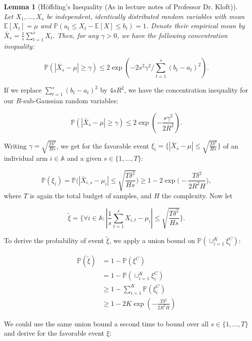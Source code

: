 \documentclass[11pt,]{article}
\newtheorem{lemma}{Lemma}
\begin{document}
\begin{lemma}[Höffding's Inequality (As in lecture notes of Professor Dr. Kloft)] \label{lemma:HoeffdingsInequality}
Let $X_1, ..., X_s$ be independent, identically distributed random variables with mean $\mathbb{E}[X_t] = \mu$ and $\mathbb{P}(a_t \leq X_t - \mathbb{E}[X] \leq b_t) = 1$. Denote their empirical mean by $\bar{X}_s=\frac{1}{s}\sum_{t=1}^{s}X_t$. Then, for any $\gamma > 0$, we have the following concentration inequality:

\begin{equation*}
\mathbb{P}(|\bar{X}_s - \mu| \geq \gamma) \leq 2\exp (-2s^2\gamma^2/\sum_{t=1}^s(b_t - a_t)^2).
\end{equation*}
\end{lemma}

If we replace \(\sum_{t=1}^s(b_t - a_t)^2\) by \(4sR^2\), we have the
concentration inequality for our \(R\)-sub-Gaussian random variables:

\[
\mathbb{P}(|\bar{X}_s - \mu| \geq \gamma) \leq 2\exp (-\frac{s\gamma^2}{2R^2}).
\]

Writing \(\gamma = \sqrt{\frac{T\delta^2}{Hs}}\), we get for the
favorable event
\(\xi_i = \{|\bar{X}_s - \mu| \leq \sqrt{\frac{T\delta^2}{Hs}}\}\) of an
individual arm \(i \in \mathbb{A}\) and a given \(s \in \{1, ..., T\}\):

\[
\mathbb{P}(\xi_i) = \mathbb{P}\Big(|\bar{X}_{i,s} - \mu_i| \leq \sqrt{\frac{T\delta^2}{Hs}}\Big) \geq 1 - 2\exp \Big(-\frac{T\delta^2}{2R^2H}\Big),
\] where \(T\) is again the total budget of samples, and \(H\) the
complexity. Now let

\[
\tilde{\xi} = \Big\{\forall i \in \mathbb{A}: |\frac{1}{s} \sum_{t=1}^{s}X_{i,t} - \mu_i| \leq \sqrt{\frac{T \delta^2}{H s}} \Big\}.
\]

To derive the probability of event \(\tilde{\xi}\), we apply a union
bound on \(\mathbb{P}(\cup_{i=1}^K \xi_i^C)\):

\begin{align*}
\mathbb{P}(\tilde{\xi}) & = 1-\mathbb{P}(\xi^C) \\
& = 1-\mathbb{P}(\cup_{i=1}^K \xi_i^C) \\
& \geq 1 - \sum_{i=1}^K \mathbb{P}(\xi_i^C) \\
& \geq 1 - 2K\exp (-\frac{T\delta^2}{2R^2H})
\end{align*}

We could use the same union bound a second time to bound over all
\(s \in \{1, ..., T\}\) and derive for the favorable event \(\xi\):
\end{document}
